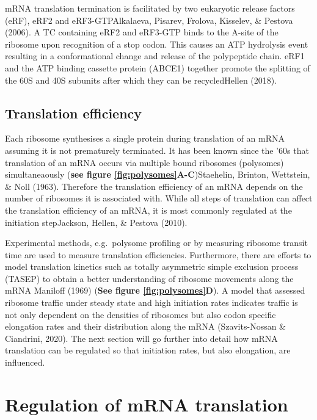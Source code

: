\documentclass[
  12pt,
  openany]{book}
\begin{document}
mRNA translation termination is facilitated by two eukaryotic release factors (eRF), eRF2 and eRF3-GTPAlkalaeva, Pisarev, Frolova, Kisselev, \& Pestova (2006). A TC containing eRF2 and eRF3-GTP binds to the A-site of the ribosome upon recognition of a stop codon. This causes an ATP hydrolysis event resulting in a conformational change and release of the polypeptide chain. eRF1 and the ATP binding cassette protein (ABCE1) together promote the splitting of the 60S and 40S subunits after which they can be recycledHellen (2018).

\subsection{Translation efficiency}

Each ribosome synthesises a single protein during translation of an mRNA assuming it is not prematurely terminated. It has been known since the '60s that translation of an mRNA occurs via multiple bound ribosomes (polysomes) simultaneaously (\textbf{see figure \ref{fig:polysomes}A-C})Staehelin, Brinton, Wettstein, \& Noll (1963). Therefore the translation efficiency of an mRNA depends on the number of ribosomes it is associated with. While all steps of translation can affect the translation efficiency of an mRNA, it is most commonly regulated at the initiation stepJackson, Hellen, \& Pestova (2010).

Experimental methods, e.g.~polysome profiling or by measuring ribosome transit time are used to measure translation efficiencies. Furthermore, there are efforts to model translation kinetics such as totally asymmetric simple exclusion process (TASEP) to obtain a better understanding of ribosome movements along the mRNA Maniloff (1969) (\textbf{See figure \ref{fig:polysomes}D}). A model that assessed ribosome traffic under steady state and high initiation rates indicates traffic is not only dependent on the densities of ribosomes but also codon specific elongation rates and their distribution along the mRNA (Szavits-Nossan \& Ciandrini, 2020). The next section will go further into detail how mRNA translation can be regulated so that initiation rates, but also elongation, are influenced.
\newline

\section{Regulation of mRNA translation} \label{regmRNA}
\end{document}
